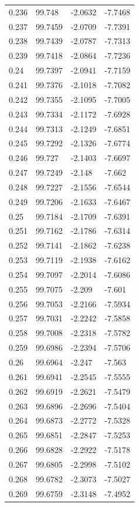 \begin{tabular}{llll}
0.236 & 99.748 & -2.0632 & -7.7468 \\
0.237 & 99.7459 & -2.0709 & -7.7391 \\
0.238 & 99.7439 & -2.0787 & -7.7313 \\
0.239 & 99.7418 & -2.0864 & -7.7236 \\
0.24 & 99.7397 & -2.0941 & -7.7159 \\
0.241 & 99.7376 & -2.1018 & -7.7082 \\
0.242 & 99.7355 & -2.1095 & -7.7005 \\
0.243 & 99.7334 & -2.1172 & -7.6928 \\
0.244 & 99.7313 & -2.1249 & -7.6851 \\
0.245 & 99.7292 & -2.1326 & -7.6774 \\
0.246 & 99.727 & -2.1403 & -7.6697 \\
0.247 & 99.7249 & -2.148 & -7.662 \\
0.248 & 99.7227 & -2.1556 & -7.6544 \\
0.249 & 99.7206 & -2.1633 & -7.6467 \\
0.25 & 99.7184 & -2.1709 & -7.6391 \\
0.251 & 99.7162 & -2.1786 & -7.6314 \\
0.252 & 99.7141 & -2.1862 & -7.6238 \\
0.253 & 99.7119 & -2.1938 & -7.6162 \\
0.254 & 99.7097 & -2.2014 & -7.6086 \\
0.255 & 99.7075 & -2.209 & -7.601 \\
0.256 & 99.7053 & -2.2166 & -7.5934 \\
0.257 & 99.7031 & -2.2242 & -7.5858 \\
0.258 & 99.7008 & -2.2318 & -7.5782 \\
0.259 & 99.6986 & -2.2394 & -7.5706 \\
0.26 & 99.6964 & -2.247 & -7.563 \\
0.261 & 99.6941 & -2.2545 & -7.5555 \\
0.262 & 99.6919 & -2.2621 & -7.5479 \\
0.263 & 99.6896 & -2.2696 & -7.5404 \\
0.264 & 99.6873 & -2.2772 & -7.5328 \\
0.265 & 99.6851 & -2.2847 & -7.5253 \\
0.266 & 99.6828 & -2.2922 & -7.5178 \\
0.267 & 99.6805 & -2.2998 & -7.5102 \\
0.268 & 99.6782 & -2.3073 & -7.5027 \\
0.269 & 99.6759 & -2.3148 & -7.4952 \\

\end{tabular}
